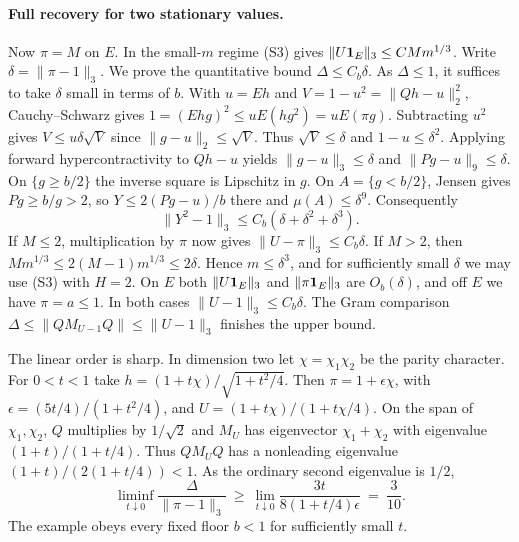 \paragraph{Full recovery for two stationary values.}
Now $\pi=M$ on $E$. In the small-$m$ regime (S3) gives
$\|U{\bf1}_E\|_3\le C M m^{1/3}$. Write $\delta=\|\pi-1\|_3$. We prove the quantitative bound
$\Delta\le C_b\delta$. As $\Delta\le1$, it suffices to take $\delta$
small in terms of $b$. With $u=E h$ and $V=1-u^2=\|Qh-u\|_2^2$,
Cauchy--Schwarz gives $1=(E hg)^2\le u E(hg^2)=u E(\pi g)$.
Subtracting $u^2$ gives $V\le u\delta\sqrt V$ since
$\|g-u\|_2\le\sqrt V$. Thus $\sqrt V\le\delta$ and $1-u\le\delta^2$.
Applying forward hypercontractivity to $Qh-u$ yields
$\|g-u\|_3\le\delta$ and $\|Pg-u\|_9\le\delta$.
On $\{g\ge b/2\}$ the inverse square is Lipschitz in $g$. On
$A=\{g<b/2\}$, Jensen gives $Pg\ge b/g>2$, so $Y\le 2(Pg-u)/b$
there and $\mu(A)\le\delta^9$. Consequently
\[
 \|Y^2-1\|_3\le C_b(\delta+\delta^2+\delta^3).
\]
If $M\le2$, multiplication by $\pi$ now gives $\|U-\pi\|_3\le C_b\delta$.
If $M>2$, then $Mm^{1/3}\le2(M-1)m^{1/3}\le2\delta$.
Hence $m\le\delta^3$, and for sufficiently small $\delta$ we may use
(S3) with $H=2$. On $E$ both $\|U{\bf1}_E\|_3$ and
$\|\pi{\bf1}_E\|_3$ are $O_b(\delta)$, and off $E$ we have
$\pi=a\le1$. In both cases $\|U-1\|_3\le C_b\delta$.
The Gram comparison $\Delta\le\|QM_{U-1}Q\|\le\|U-1\|_3$
finishes the upper bound.

The linear order is sharp. In dimension two let $\chi=\chi_1\chi_2$
be the parity character. For $0<t<1$ take
$h=(1+t\chi)/\sqrt{1+t^2/4}$. Then
$\pi=1+\epsilon\chi$, with $\epsilon=(5t/4)/(1+t^2/4)$, and
$U=(1+t\chi)/(1+t\chi/4)$. On the span of $\chi_1,\chi_2$,
$Q$ multiplies by $1/\sqrt2$ and $M_U$ has eigenvector
$\chi_1+\chi_2$ with eigenvalue $(1+t)/(1+t/4)$.
Thus $QM_UQ$ has a nonleading eigenvalue
$(1+t)/(2(1+t/4))<1$. As the ordinary second eigenvalue is $1/2$,
\[
 \liminf_{t\downarrow0}\frac{\Delta}{\|\pi-1\|_3}
 \ \ge\ \lim_{t\downarrow0}\frac{3t}{8(1+t/4)\epsilon}
 \ =\ \frac3{10}.
\]
The example obeys every fixed floor $b<1$ for sufficiently small $t$.


